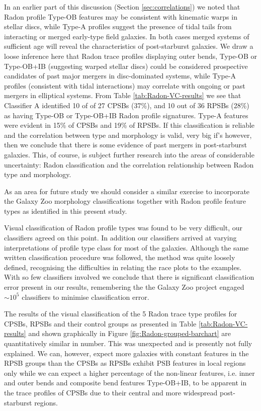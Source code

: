 In an earlier part of this discussion (Section  \ref{sec:correlations}) we noted that Radon profile Type-OB features may be consistent with kinematic warps in stellar discs, while Type-A profiles suggest the presence of tidal tails from interacting or merged early-type field galaxies. In both cases merged systems of sufficient age will reveal the characteristics of post-starburst galaxies. We draw a loose inference here that Radon trace profiles displaying outer bends, Type-OB or Type-OB+IB (suggesting warped stellar discs) could be considered prospective candidates of past major mergers in disc-dominated systems, while Type-A profiles (consistent with tidal interactions) may correlate with ongoing or past mergers in elliptical systems. From Table \ref{tab:Radon-VC-results} we see that Classifier A identified 10 of of 27 CPSBs (37\%), and 10 out of 36 RPSBs (28\%) as having Type-OB or Type-OB+IB Radon profile signatures. Type-A features were evident in  15\% of CPSBs and 19\% of RPSBs. If this classification is reliable and the correlation between type and morphology is valid, very big if's however, then we conclude that there is some evidence of past mergers in post-starburst galaxies. This, of course, is subject further research into the areas of considerable uncertainty: Radon classification and the correlation relationship between Radon type and morphology.

As an area for future study we should consider a similar exercise to incorporate the Galaxy Zoo morphology classifications together with Radon profile feature types as identified in this present study.

Visual classification of Radon profile types was found to be very difficult, our classifiers agreed on this point. In addition our classifiers arrived at varying interpretations of profile type class for most of the galaxies. Although the same written classification procedure was followed, the method was quite loosely defined, recognising the difficulties in relating the race plots to the examples. With so few classifiers involved we conclude that there is significant classification error present in our results, remembering the the Galaxy Zoo project engaged $\sim10^5$ classifiers to minimise classification error.

The results of the visual classification of the 5 Radon trace type profiles for CPSBs, RPSBs and their control groups as presented in Table \ref{tab:Radon-VC-results} and shown graphically in Figure \ref{fig:Radon-grouped-barchart} are quantitatively similar in number. This was unexpected and is presently not fully explained. We can, however, expect more galaxies with constant features in the RPSB groups than the CPSBs as RPSBs exhibit PSB features in local regions only while we can expect a higher percentage of the non-linear features, i.e. inner and outer bends and composite bend features Type-OB+IB, to be apparent in the trace profiles of CPSBs due to their central and more widespread post-starburst regions. 

